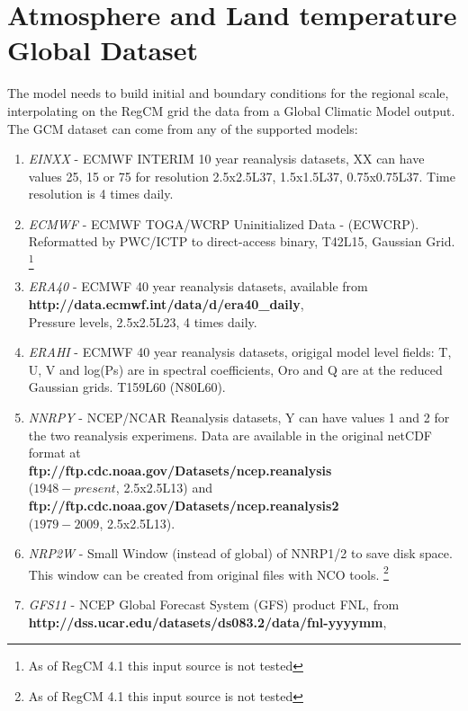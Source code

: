 \section{Atmosphere and Land temperature Global Dataset}

The model needs to build initial and boundary conditions for the regional scale,
interpolating on the RegCM grid the data from a Global Climatic Model output.
The GCM dataset can come from any of the supported models:

\begin{enumerate}
\item {\em EINXX} - ECMWF INTERIM 10 year reanalysis datasets,
XX can have values 25, 15 or 75 for resolution 2.5x2.5L37, 1.5x1.5L37,
0.75x0.75L37. Time resolution is 4 times daily.
\item {\em ECMWF} - ECMWF TOGA/WCRP Uninitialized Data - (ECWCRP).
Reformatted by PWC/ICTP to direct-access binary, T42L15, Gaussian Grid.
\footnote{As of RegCM 4.1 this input source is not tested}
\item {\em ERA40} - ECMWF 40 year reanalysis datasets, available from \\
{\bf http://data.ecmwf.int/data/d/era40\_daily}, \\
Pressure levels, 2.5x2.5L23, 4 times daily.
\item {\em ERAHI} - ECMWF 40 year reanalysis datasets, origigal model level
fields: T, U, V and log(Ps) are in spectral coefficients, Oro and Q are at the
reduced Gaussian grids. T159L60 (N80L60).
\item {\em NNRPY} - NCEP/NCAR Reanalysis datasets, Y can have values 1 and 2
for the two reanalysis experimens. Data are available in the original netCDF
format at \\ {\bf ftp://ftp.cdc.noaa.gov/Datasets/ncep.reanalysis} \\
($1948 - present$, 2.5x2.5L13) and \\
{\bf ftp://ftp.cdc.noaa.gov/Datasets/ncep.reanalysis2} \\
($1979 - 2009$, 2.5x2.5L13). 
\item {\em NRP2W} - Small Window (instead of global) of NNRP1/2 to save disk
space. This window can be created from original files with NCO tools.
\footnote{As of RegCM 4.1 this input source is not tested}
\item {\em GFS11} - NCEP Global Forecast System (GFS) product FNL, from \\
{\bf http://dss.ucar.edu/datasets/ds083.2/data/fnl-yyyymm}, \\

\end{enumerate}
